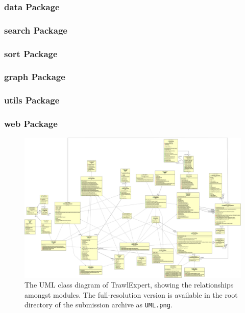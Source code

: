 \documentclass{article}
\begin{document}
\subsubsection{data Package}

\subsubsection{search Package}

\subsubsection{sort Package}

\subsubsection{graph Package}

\subsubsection{utils Package}

\subsubsection{web Package}

\begin{figure}
\centering
\includegraphics[angle=90,width=14cm]{ClassUML.png}
\caption{The UML class diagram of TrawlExpert, showing the relationships amongst modules. The full-resolution version is available in the root directory of the submission archive as \texttt{UML.png}.}
\label{fig:UML}
\end{figure}
\end{document}
